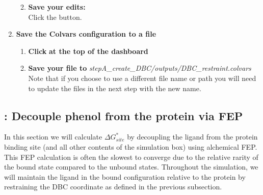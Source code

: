 \documentclass[9pt,tutorial]{Styling/livecoms}
\newcommand{\filepath}[1]{\textit{#1}}
\newcommand{\button}[1]{
  \inlineBox[gray]{\texttt{#1}}
}
\begin{document}
\begin{enumerate}
\begin{enumerate}[label=\alph*., ref=\theenumi.\alph*]
\begin{itemize}
            \end{itemize}
            \item \textbf{Save your edits:}\\
            Click the \button{Apply [Ctrl-s]} button.
        \end{enumerate}
        \item \textbf{Save the Colvars configuration to a file}
        \begin{enumerate}[label=\alph*., ref=\theenumi.\alph*]
            \item \textbf{Click} \button{Save} \textbf{at the top of the dashboard}
            \item \textbf{Save your file to} \filepath{stepA\_create\_DBC/outputs/DBC\_restraint.colvars}\\
            Note that if you choose to use a different file name or path you will need to update the files in the next step with the new name.
        \end{enumerate}
    \end{enumerate}

\subsection{\hspace{-1em}: Decouple phenol from the protein via FEP}\label{step:proteinDecouple}
    \begin{tcolorbox}[colback=blue!5!white,colframe=blue!75!black]
    In this section we will calculate $\Delta G_{site}^*$ by decoupling the ligand from the protein binding site (and all other contents of the simulation box) using alchemical FEP. This FEP calculation is often the slowest to converge due to the relative rarity of the bound state compared to the unbound states. Throughout the simulation, we will maintain the ligand in the bound configuration relative to the protein by restraining the DBC coordinate as defined in the previous subsection.
    \end{tcolorbox}
    
\end{document}
